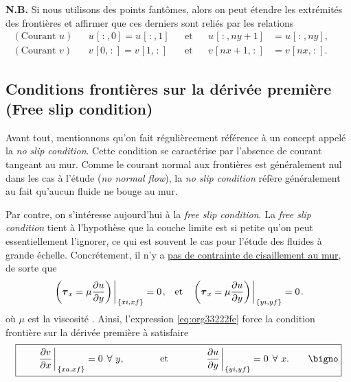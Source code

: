\documentclass[10pt]{article}
\numberwithin{equation}{section}
\newcommand{\pt}{\hspace{1pt}} %
\begin{document}
\textbf{N.B.} Si nous utilisons des points fantômes, alors on peut étendre les extrémités des frontières et affirmer que ces derniers sont reliés par les relations
\begin{subequations}
\begin{align}
(\text{Courant }u) &&  u\pt[\pt:\pt,0] = u\pt[\pt:\pt,1] && \text{et} && u\pt[\pt:\pt,ny+1] &= u\pt[\pt:\pt,ny],&&\\
(\text{Courant }v) &&  v\pt[0,\pt:\pt] = v\pt[1,\pt:\pt] && \text{et} && v\pt[nx+1,\pt:\pt] &= v\pt[nx,\pt:\pt].&&
\end{align}
\end{subequations}
\subsection{Conditions frontières sur la dérivée première (Free slip condition)}
\label{sec:org62eaa4e}
Avant tout, mentionnons qu'on fait régulièreement référence à un concept appelé la \emph{no slip condition}.
Cette condition se caractérise par l'absence de courant tangeant au mur.
Comme le courant normal aux frontières est généralement nul dans les cas à l'étude (\emph{no normal flow}), la \emph{no slip condition} réfère généralement au fait qu'aucun fluide ne bouge au mur.\bigskip

Par contre, on s'intéresse aujourd'hui à la \emph{free slip condition}.
La \emph{free slip condition} tient à l'hypothèse que la couche limite est si petite qu'on peut essentiellement l'ignorer, ce qui est souvent le cas pour l'étude des fluides à grande échelle.
Concrétement, il n'y a \href{https://physics.stackexchange.com/questions/383096/understanding-free-slip-boundary-condition\#:\~:text=On\%20the\%20other\%20hand\%2C\%20the,the\%20tangential\%20component\%20is\%20unrestricted.}{pas de contrainte de cisaillement au mur}, de sorte que
\begin{align}
\label{eq:org33222fe}
&&\eval{\qty(\boldsymbol{\tau}_x = \mu \pdv{u}{y})\pt }_{\pt\{xi,xf\}} = 0\pt, && \text{et} &&
  \eval{\qty(\boldsymbol{\tau}_x = \mu \pdv{u}{y})\pt }_{\pt\{yi,yf\}} = 0\pt. &&
\end{align}
où \(\mu\) est la viscosité \autocite{tan2018applying}.
Ainsi, l'expression \ref{eq:org33222fe} force la condition frontière sur la dérivée première à satisfaire 
\begin{equation}
\boxed{\hspace{0.7cm}\eval{\pdv{v}{x}\pt }_{\pt\{xa,xf\}} = 0\pt\ \forall\ y,\hspace{1.3cm} \text{et} \hspace{1.3cm} \eval{\pdv{u}{y}\pt }_{\pt \{yi,yf\}} = 0\pt\ \forall\ x.\hspace{0.7cm}\bigno}
\end{equation}
\end{document}
